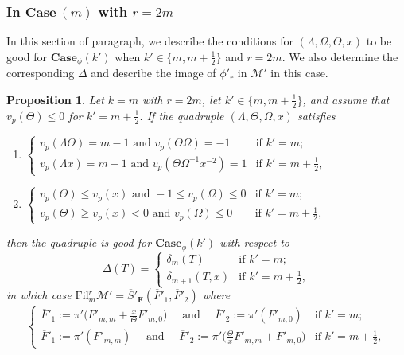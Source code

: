 \documentclass[11pt]{amsart}
\theoremstyle{definition}
\numberwithin{equation}{subsection}
\theoremstyle{plain}
\theoremstyle{plain}
\theoremstyle{plain}
\theoremstyle{plain}
\theoremstyle{plain}
\theoremstyle{plain}
\theoremstyle{plain}
\theoremstyle{plain}
\newtheorem{prop}[equation]{Proposition}
\theoremstyle{plain}
\theoremstyle{plain}
\theoremstyle{plain}
\theoremstyle{plain}
\theoremstyle{definition}
\theoremstyle{definition}
\theoremstyle{definition}
\theoremstyle{remark}
\renewcommand{\(}{\textup{(}}
\renewcommand{\)}{\textup{)}}
\newcommand{\F}{\mathbf{F}}
\newcommand{\barS}{\overline{S}}
\newcommand{\cM}{\mathcal{M}}
\newcommand{\Fil}{\mathrm{Fil}}
\newcommand{\barF}{\overline{F}}
\begin{document}
\subsubsection{\textbf{In $\mathbf{Case}~(m)$ with $r=2m$}}
In this section of paragraph, we describe the conditions for $(\Lambda,\Omega,\Theta,x)$ to be good for $\mathbf{Case}_\phi(k')$ when $k'\in\{m,m+\frac{1}{2}\}$ and $r=2m$. We also determine the corresponding $\Delta$ and describe the image of $\phi'_r$ in $\cM'$ in this case.



\begin{prop}\label{prop-cM-Case-m}
Let $k=m$ with $r=2m$, let $k'\in\{m,m+\frac{1}{2}\}$, and assume that $v_p(\Theta)\leq 0$ for $k'=m+\frac{1}{2}$. If the quadruple $(\Lambda,\Theta,\Omega,x)$ satisfies
    \begin{enumerate}[leftmargin=*]
      \item $\begin{cases}
          v_p(\Lambda \Theta)=m-1\mbox{ and } v_p(\Theta\Omega)=-1 & \mbox{if } k'=m; \\
          v_p(\Lambda x)=m-1\mbox{ and } v_p(\Theta\Omega^{-1}x^{-2})=1 & \mbox{if }k'=m+\frac{1}{2},
        \end{cases}$
      \item $\begin{cases}
          v_p(\Theta)\leq v_p(x) \mbox{ and } -1\leq v_p(\Omega)\leq 0
           & \mbox{if } k'=m; \\
          v_p(\Theta)\geq v_p(x)<0 \mbox{ and } v_p(\Omega)\leq 0 & \mbox{if }k'=m+\frac{1}{2},
        \end{cases}$
    \end{enumerate}
    then the quadruple is good for $\mathbf{Case}_\phi(k')$ with respect to
    $$\Delta(T)=
        \begin{cases}
            \delta_{m}(T) & \mbox{if } k'=m; \\
            \delta_{m+1}(T,x) & \mbox{if } k'=m+\frac{1}{2},
        \end{cases}$$
in which case
$\Fil^r_{m}\cM'=\barS'_\F(\barF'_1,\barF'_2)$ where
$$
\begin{cases}
\barF'_1:=\pi'\big(F'_{m,m}+\frac{x}{\Theta}F'_{m,0}\big)\quad\mbox{ and }\quad\barF'_2:=\pi'(F'_{m,0}) &\mbox{if }k'=m;\\
\barF'_1:=\pi'(F'_{m,m})\quad\mbox{ and }\quad\barF'_2:=\pi'\big(\frac{\Theta}{x}F'_{m,m}+F'_{m,0}\big) &\mbox{if }k'=m+\frac{1}{2},
\end{cases}$$

\end{prop}
\end{document}
